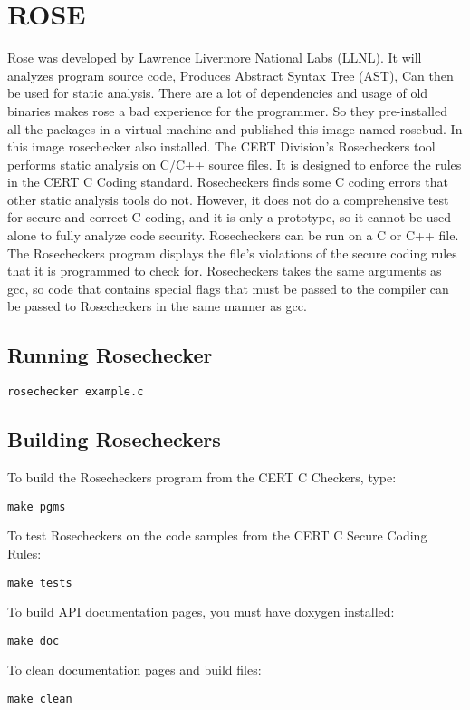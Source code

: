\section{ROSE}

Rose was developed by Lawrence Livermore National Labs (LLNL). It will analyzes program source code, Produces Abstract Syntax Tree (AST), Can then be used for static analysis. There are a lot of dependencies and usage of old binaries makes rose a bad experience for the programmer. So they pre-installed all the packages in a virtual machine and published this  image named rosebud. In this image rosechecker also installed. The CERT Division's Rosecheckers tool performs static analysis on C/C++ source files. It is designed to enforce the rules in the CERT C Coding standard. Rosecheckers finds some C coding errors that other static analysis tools do not. However, it does not do a comprehensive test for secure and correct C coding, and it is only a prototype, so it cannot be used alone to fully analyze code security. 
Rosecheckers can be run on a C or C++ file. The Rosecheckers program displays the file's violations of the secure coding rules that it is programmed to check for. Rosecheckers takes the same arguments as gcc, so code that contains special flags that must be passed to the compiler can be passed to Rosecheckers in the same manner as gcc.
\subsection{Running Rosechecker}
\begin{verbatim}
rosechecker example.c
\end{verbatim}
\subsection{Building Rosecheckers}
To build the Rosecheckers program from the CERT C Checkers, type:
\begin{verbatim}
make pgms
\end{verbatim}

To test Rosecheckers on the code samples from the CERT C Secure Coding Rules:
\begin{verbatim}
make tests
\end{verbatim}

To build API documentation pages, you must have doxygen installed:
\begin{verbatim}
make doc
\end{verbatim}

To clean documentation pages and build files:
\begin{verbatim}
make clean
\end{verbatim}


